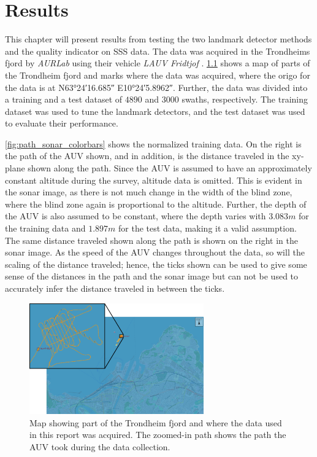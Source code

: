 \chapter{Results}

This chapter will present results from testing the two landmark detector methods and the quality indicator on SSS data. The data was acquired in the Trondheims fjord by \textit{AURLab} using their vehicle \textit{LAUV Fridtjof} \cite{LAUVNTNU}. \cref{fig:neptus_screenshot} shows a map of parts of the Trondheim fjord and marks where the data was acquired, where the origo for the data is at N\ang{63;24;16.685} E\ang{10;24;5.8962}. Further, the data was divided into a training and a test dataset of $4890$ and $3000$ swaths, respectively. The training dataset was used to tune the landmark detectors, and the test dataset was used to evaluate their performance. 

\cref{fig:path_sonar_colorbars} shows the normalized training data. On the right is the path of the AUV shown, and in addition, is the distance traveled in the xy-plane shown along the path. Since the AUV is assumed to have an approximately constant altitude during the survey, altitude data is omitted. This is evident in the sonar image, as there is not much change in the width of the blind zone, where the blind zone again is proportional to the altitude. Further, the depth of the AUV is also assumed to be constant, where the depth varies with $3.083 m$ for the training data and $1.897 m $ for the test data, making it a valid assumption. The same distance traveled shown along the path is shown on the right in the sonar image. As the speed of the AUV changes throughout the data, so will the scaling of the distance traveled; hence, the ticks shown can be used to give some sense of the distances in the path and the sonar image but can not be used to accurately infer the distance traveled in between the ticks. 

\begin{figure} [h!]%
  \centering
  \includegraphics[width=0.67\textwidth]{figures/hercules_data.png}
  \caption{Map showing part of the Trondheim fjord and where the data used in this report was acquired. The zoomed-in path shows the path the AUV took during the data collection. }
  \label{fig:neptus_screenshot}
\end{figure}

